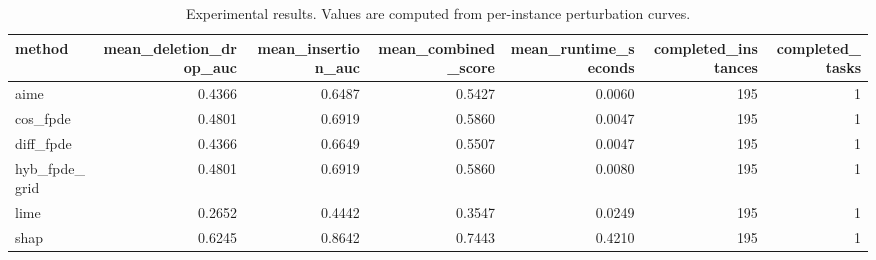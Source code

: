 \begin{table}[t]
\caption{Experimental results. Values are computed from per-instance perturbation curves.}
\label{tab:main_results_computed}
\centering
\begin{tabular}{lrrrrrr}
\toprule
method & mean\_deletion\_drop\_auc & mean\_insertion\_auc & mean\_combined\_score & mean\_runtime\_seconds & completed\_instances & completed\_tasks \\
\midrule
aime & 0.4366 & 0.6487 & 0.5427 & 0.0060 & 195 & 1 \\
cos\_fpde & 0.4801 & 0.6919 & 0.5860 & 0.0047 & 195 & 1 \\
diff\_fpde & 0.4366 & 0.6649 & 0.5507 & 0.0047 & 195 & 1 \\
hyb\_fpde\_grid & 0.4801 & 0.6919 & 0.5860 & 0.0080 & 195 & 1 \\
lime & 0.2652 & 0.4442 & 0.3547 & 0.0249 & 195 & 1 \\
shap & 0.6245 & 0.8642 & 0.7443 & 0.4210 & 195 & 1 \\
\bottomrule
\end{tabular}

\end{table}
